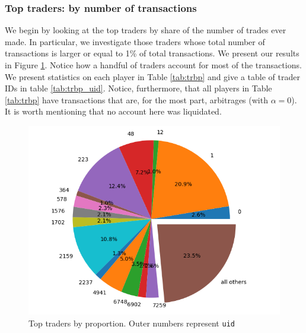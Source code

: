 \documentclass[]{scrartcl}
\begin{document}
	\subsubsection*{Top traders: by number of transactions} 
	We begin by looking at the top traders by share of the number of trades ever made. In particular, we investigate those traders whose total number of transactions is larger or equal to 1\% of total transactions. We present our results in Figure \ref{fig:tradesbyprop}.  Notice how a handful of traders account for most of the transactions. We present statistics on each player in Table \ref{tab:trbp} and give a table of trader IDs in table \ref{tab:trbp_uid}. Notice, furthermore, that all players in  Table \ref{tab:trbp} have transactions that are, for the most part, arbitrages (with $\alpha=0$). It is worth mentioning that no account here was liquidated.
	
	\begin{figure}[htp]
		\centering
		\includegraphics[width=0.7\linewidth]{figures/trades_by_prop}
		\caption{Top traders by proportion. Outer numbers represent \texttt{uid}}
		\label{fig:tradesbyprop}
	\end{figure}
	
\end{document}
